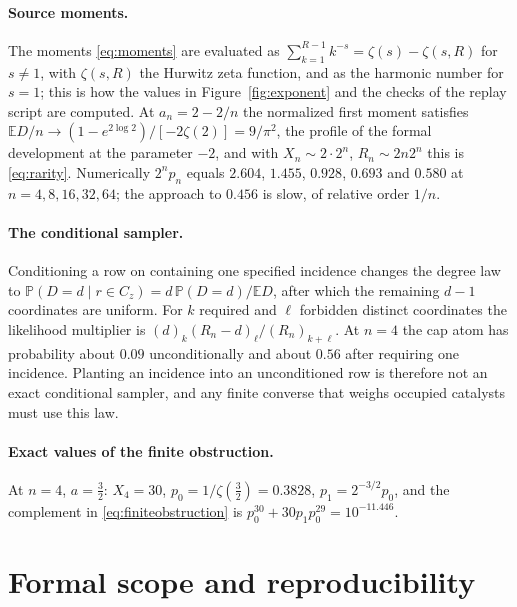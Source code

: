 \documentclass[11pt,letterpaper]{article}
\theoremstyle{plain}
\theoremstyle{definition}
\theoremstyle{remark}
\numberwithin{equation}{section}
\newcommand{\PP}{\mathbb P}
\newcommand{\EE}{\mathbb E}
\begin{document}
\paragraph{Source moments.}
The moments \eqref{eq:moments} are evaluated as $\sum_{k=1}^{R-1}k^{-s}=\zeta(s)-\zeta(s,R)$ for $s\ne1$, with $\zeta(s,R)$ the Hurwitz zeta function, and as the harmonic number for $s=1$; this is how the values in Figure~\ref{fig:exponent} and the checks of the replay script are computed. At $a_n=2-2/n$ the normalized first moment satisfies $\EE D/n\to(1-e^{2\log2})/[-2\zeta(2)]=9/\pi^2$, the profile of the formal development at the parameter $-2$, and with $X_n\sim2\cdot2^n$, $R_n\sim2n2^n$ this is \eqref{eq:rarity}. Numerically $2^np_n$ equals $2.604$, $1.455$, $0.928$, $0.693$ and $0.580$ at $n=4,8,16,32,64$; the approach to $0.456$ is slow, of relative order $1/n$.

\paragraph{The conditional sampler.}
Conditioning a row on containing one specified incidence changes the degree law to $\PP(D=d\mid r\in C_z)=d\,\PP(D=d)/\EE D$, after which the remaining $d-1$ coordinates are uniform. For $k$ required and $\ell$ forbidden distinct coordinates the likelihood multiplier is $(d)_k(R_n-d)_\ell/(R_n)_{k+\ell}$. At $n=4$ the cap atom has probability about $0.09$ unconditionally and about $0.56$ after requiring one incidence. Planting an incidence into an unconditioned row is therefore not an exact conditional sampler, and any finite converse that weighs occupied catalysts must use this law.

\paragraph{Exact values of the finite obstruction.}
At $n=4$, $a=\tfrac32$: $X_4=30$, $p_0=1/\zeta(\tfrac32)=0.3828$, $p_1=2^{-3/2}p_0$, and the complement in \eqref{eq:finiteobstruction} is $p_0^{30}+30p_1p_0^{29}=10^{-11.446}$.

\section{Formal scope and reproducibility}\label{app:formal}
\end{document}

